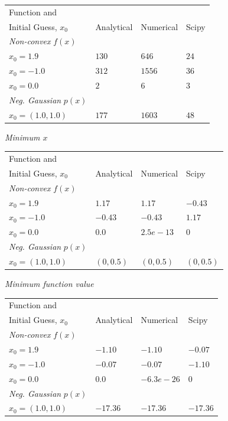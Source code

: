 \documentclass{article}
\begin{document}
\begin{tabular}{|l|l|l|l|}
\hline
Function and & & &\\ Initial Guess, $x_0$ & Analytical & Numerical & Scipy \\ \hline
\textit{Non-convex} $f(x)$ & & &\\ \hline
$x_0 = 1.9$ & $130$ & $646$ & $24$\\\hline
$x_0 = -1.0$ & $312$ & $1556$ & $36$ \\ \hline
$x_0 = 0.0$ & $2$ & $6$ & $3$\\ \hline
\textit{Neg. Gaussian} $p(x)$ & & & \\ \hline
$x_0 = (1.0,1.0)$ & $177$ & $1603$ & $48$ \\ \hline
\end{tabular}

\textit{Minimum $x$}

\begin{tabular}{|l|l|l|l|}
\hline
Function and & & &\\ Initial Guess, $x_0$ & Analytical & Numerical & Scipy \\ \hline
\textit{Non-convex} $f(x)$ & & &\\ \hline
$x_0 = 1.9$ & $1.17$ & $1.17$ & $-0.43$\\\hline
$x_0 = -1.0$ & $-0.43$ & $-0.43$ & $1.17$ \\ \hline
$x_0 = 0.0$ & $0.0$ & $2.5e-13$ & $0$\\ \hline
\textit{Neg. Gaussian} $p(x)$ & & & \\ \hline
$x_0 = (1.0,1.0)$ & $(0,0.5)$ & $(0,0.5)$ & $(0,0.5)$ \\ \hline
\end{tabular}

\textit{Minimum function value}

\begin{tabular}{|l|l|l|l|}
\hline
Function and & & &\\ Initial Guess, $x_0$ & Analytical & Numerical & Scipy \\ \hline
\textit{Non-convex} $f(x)$ & & &\\ \hline
$x_0 = 1.9$ & $-1.10$ & $-1.10$ & $-0.07$\\\hline
$x_0 = -1.0$ & $-0.07$ & $-0.07$ & $-1.10$ \\ \hline
$x_0 = 0.0$ & $0.0$ & $-6.3e-26$ & $0$\\ \hline
\textit{Neg. Gaussian} $p(x)$ & & & \\ \hline
$x_0 = (1.0,1.0)$ & $-17.36$ & $-17.36$ & $-17.36$ \\ \hline
\end{tabular}
\end{document}
